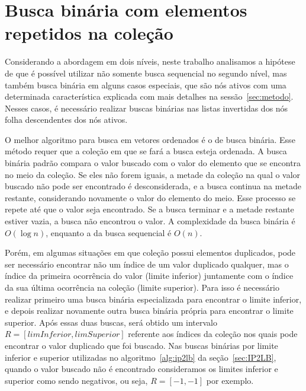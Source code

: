 \section{Busca binária com elementos repetidos na coleção}
\label{sec:binary_search_with_duplicates}

Considerando a abordagem em dois níveis, neste trabalho analisamos a hipótese de que é possível utilizar não somente busca sequencial no segundo nível, mas também busca binária em alguns casos especiais, que são nós ativos com uma determinada característica explicada com mais detalhes na sessão~\ref{sec:metodo}. Nesses casos, é necessário realizar buscas binárias nas listas invertidas dos nós folha descendentes dos nós ativos.

O melhor algoritmo para busca em vetores ordenados é o de busca binária. Esse método requer que a coleção em que se fará a busca esteja ordenada. A busca binária padrão compara o valor buscado com o valor do elemento que se encontra no meio da coleção. Se eles não forem iguais, a metade da coleção na qual o valor buscado não pode ser encontrado é desconsiderada, e a busca continua na metade restante, considerando novamente o valor do elemento do meio. Esse processo se repete até que o valor seja encontrado. Se a busca terminar e a metade restante estiver vazia, a busca não encontrou o valor. A complexidade da busca binária é $O(\log n)$, enquanto a da busca sequencial é $O(n)$.

Porém, em algumas situações em que coleção possui elementos duplicados, pode ser necessário encontrar não um índice de um valor duplicado qualquer, mas o índice da primeira ocorrência do valor (limite inferior) juntamente com o índice da sua última ocorrência na coleção (limite superior). Para isso é necessário realizar primeiro uma busca binária especializada para encontrar o limite inferior, e depois realizar novamente outra busca binária própria para encontrar o limite superior. Após essas duas buscas, será obtido um intervalo $R = [limInferior, limSuperior]$ referente aos índices da coleção nos quais pode encontrar o valor duplicado que foi buscado. Nas buscas binárias por limite inferior e superior utilizadas no algoritmo~\ref{alg:ip2lb} da seção~\ref{sec:IP2LB}, quando o valor buscado não é encontrado consideramos os limites inferior e superior como sendo negativos, ou seja, $R = [-1, -1]$ por exemplo.